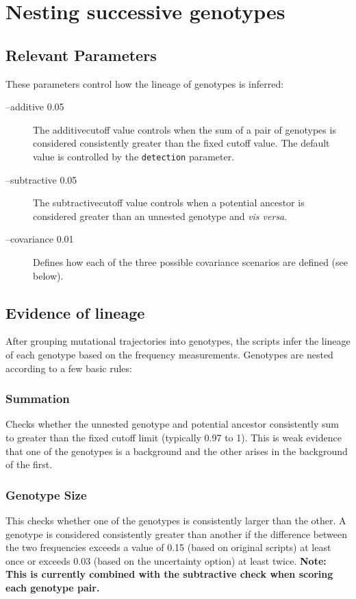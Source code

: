 \documentclass{book}
\newcommand{\unnestedlabel}{unnested genotype}
\newcommand{\ancestorlabel}{potential ancestor}
\newcommand{\parameteradditive}{additivecutoff}
\newcommand{\parametersubtractive}{subtractivecutoff}
\begin{document}
\chapter{Nesting successive genotypes}

\section{Relevant Parameters}
These parameters control how the lineage of genotypes is inferred:
\begin{description}
  \item[--additive 0.05] The \parameteradditive{} value controls when the sum of a pair of genotypes is considered consistently greater than the fixed cutoff value.
    The default value is controlled by the \verb|detection| parameter. 
  \item[--subtractive 0.05] The \parametersubtractive{} value controls when a \ancestorlabel{} is considered greater than an \unnestedlabel{} and \textit{vis versa}.
  \item[--covariance 0.01] Defines how each of the three possible covariance scenarios are defined (see below).
\end{description}  

\section{Evidence of lineage}
After grouping mutational trajectories into genotypes, the scripts infer the lineage of each genotype based on the frequency measurements.
Genotypes are nested according to a few basic rules:

\subsection{Summation}
Checks whether the \unnestedlabel{} and \ancestorlabel{} consistently sum to greater than the fixed cutoff limit (typically 0.97 to 1). 
This is weak evidence that one of the genotypes is a background and the other arises in the background of the first. 

\subsection{Genotype Size}
This checks whether one of the genotypes is consistently larger than the other. 
A genotype is considered consistently greater than another if the difference between the two frequencies exceeds a value of 0.15 
(based on original scripts) at least once or exceeds 0.03 (based on the uncertainty option) at least twice. 
\textbf{Note: This is currently combined with the subtractive check when scoring each genotype pair.}
\end{document}
